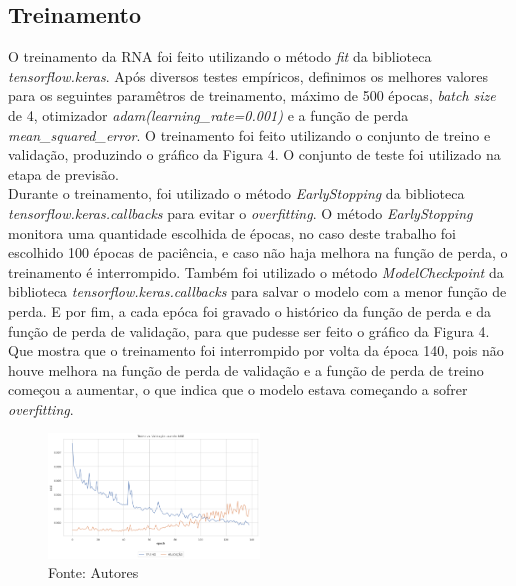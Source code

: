 \documentclass[
	article,			%
	11pt,				%
	a4paper,			%
	chapter=TITLE,		%
	section=TITLE,		%
	subsection=TITLE,	%
	subsubsection=TITLE %
	english,			%
	brazil,				%
	sumario=tradicional
	]{abntex2}
\begin{document}
\subsection{Treinamento}
O treinamento da RNA foi feito utilizando o método \textit{fit} da biblioteca \textit{tensorflow.keras}. Após diversos testes empíricos, definimos os melhores valores para os seguintes paramêtros de treinamento, máximo de 500 épocas, \textit{batch size} de 4, otimizador \textit{adam(learning\_rate=0.001)} e a função de perda \textit{mean\_squared\_error}. O treinamento foi feito utilizando o conjunto de treino e validação, produzindo o gráfico da Figura 4. O conjunto de teste foi utilizado na etapa de previsão. 
\\ \indent
Durante o treinamento, foi utilizado o método \textit{EarlyStopping} da biblioteca \textit{tensorflow.keras.callbacks} para evitar o \textit{overfitting}. O método \textit{EarlyStopping} monitora uma quantidade escolhida de épocas, no caso deste trabalho foi escolhido 100 épocas de paciência, e caso não haja melhora na função de perda, o treinamento é interrompido. Também foi utilizado o método \textit{ModelCheckpoint} da biblioteca \textit{tensorflow.keras.callbacks} para salvar o modelo com a menor função de perda. E por fim, a cada epóca foi gravado o histórico da função de perda e da função de perda de validação, para que pudesse ser feito o gráfico da Figura 4. Que mostra que o treinamento foi interrompido por volta da época 140, pois não houve melhora na função de perda de validação e a função de perda de treino começou a aumentar, o que indica que o modelo estava começando a sofrer \textit{overfitting}. 
\begin{figure}[htbp]
	\centering
	\includegraphics[width=0.5\textwidth]{imagens/imgCodigos/historicoMSExEpocasTreino.png}
	\caption{Fonte: Autores}
	\label{figure4}
\end{figure}
\end{document}

